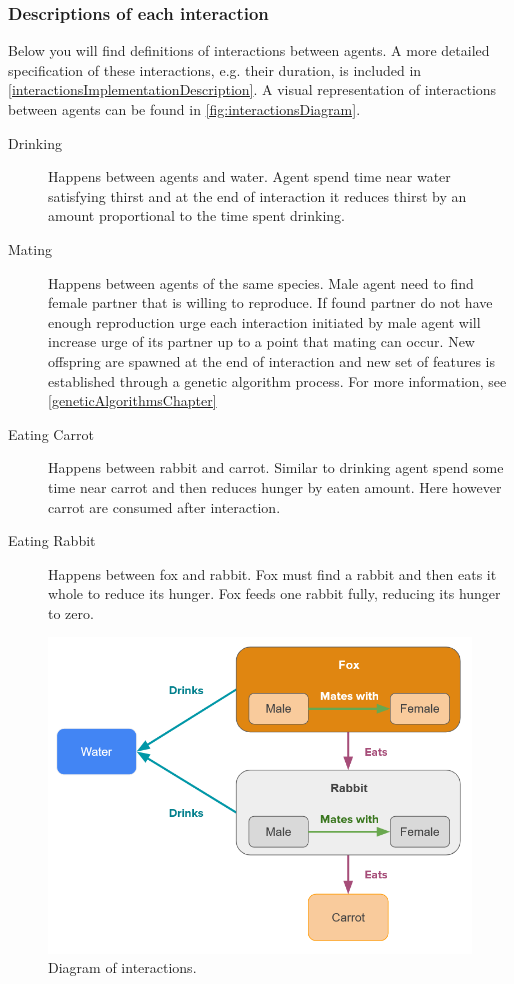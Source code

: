 \subsubsection{Descriptions of each interaction}
Below you will find definitions of interactions between agents. A more detailed specification of these interactions, e.g. their duration, is included in \autoref{interactionsImplementationDescription}. A visual representation of interactions between agents can be found in \autoref{fig:interactionsDiagram}.
\begin{description}
    \item[Drinking] Happens between agents and water. Agent spend time near water satisfying thirst and at the end of interaction it reduces thirst by an amount proportional to the time spent drinking.
    \item[Mating] Happens between agents of the same species. Male agent need to find female partner that is willing to reproduce. If found partner do not have enough reproduction urge each interaction initiated by male agent will increase urge of its partner up to a point that mating can occur. New offspring are spawned at the end of interaction and new set of features is established through a genetic algorithm process. For more information, see \autoref{geneticAlgorithmsChapter}
    \item[Eating Carrot] Happens between rabbit and carrot. Similar to drinking agent spend some time near carrot and then reduces hunger by eaten amount. Here however carrot are consumed after interaction.
    \item[Eating Rabbit] Happens between fox and rabbit. Fox must find a rabbit and then eats it whole to reduce its hunger. Fox feeds one rabbit fully, reducing its hunger to zero.
\end{description}

\begin{figure}
    \centering
    \includegraphics[width=\textwidth]{Images/interaction_diagram_v2.png}
    \caption{Diagram of interactions.}
    \label{fig:interactionsDiagram}
\end{figure}
